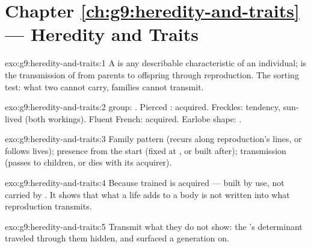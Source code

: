 \section*{Chapter \ref{ch:g9:heredity-and-traits} --- Heredity and Traits}

\begin{solution}{exo:g9:heredity-and-traits:1}
A  is any describable characteristic of an individual;
 is the transmission of  from parents to
offspring through reproduction. The sorting test: what two
 cannot carry, families cannot transmit.
\end{solution}

\begin{solution}{exo:g9:heredity-and-traits:2}
 group: . Pierced : acquired. Freckles:
 tendency, sun-lived (both workings). Fluent
French: acquired. Earlobe shape: .
\end{solution}

\begin{solution}{exo:g9:heredity-and-traits:3}
Family pattern (recurs along reproduction's lines, or
follows lives); presence from the start (fixed at
, or built after); transmission (passes to
children, or dies with its acquirer).
\end{solution}

\begin{solution}{exo:g9:heredity-and-traits:4}
Because trained  is acquired --- built by use, not
carried by . It shows that what a life adds to a
body is not written into what reproduction transmits.
\end{solution}

\begin{solution}{exo:g9:heredity-and-traits:5}
Transmit what they do not show: the 's determinant
traveled through them hidden, and surfaced a generation
on.
\end{solution}

